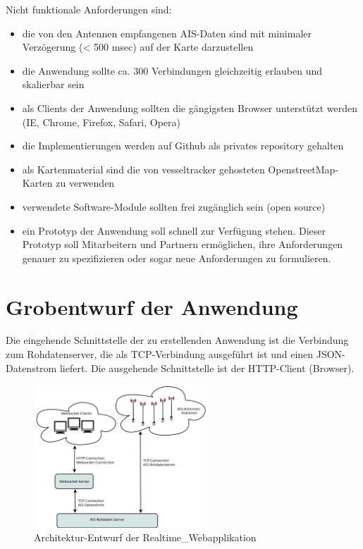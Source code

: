 Nicht funktionale Anforderungen sind:
\begin{itemize}
\item die von den Antennen empfangenen AIS-Daten sind mit minimaler Verzögerung (< 500 msec) auf der Karte darzustellen
\item die Anwendung sollte ca. 300 Verbindungen gleichzeitig erlauben und skalierbar sein
\item als Clients der Anwendung sollten die gängigsten Browser unterstützt werden (IE, Chrome, Firefox, Safari, Opera) 
\item die Implementierungen werden auf Github als privates repository gehalten
\item als Kartenmaterial sind die von vesseltracker gehosteten OpenstreetMap-Karten zu verwenden
\item verwendete Software-Module sollten frei zugänglich sein (open source) 
\item ein Prototyp der Anwendung soll schnell zur Verfügung stehen. Dieser Prototyp soll Mitarbeitern und Partnern ermöglichen, ihre Anforderungen genauer zu spezifizieren oder sogar neue Anforderungen zu formulieren. 
\end{itemize}

\section{Grobentwurf der Anwendung}\label{s.Grobentwurf der Anwendung}
Die eingehende Schnittstelle der zu erstellenden Anwendung ist die Verbindung zum Rohdatenserver, die als TCP-Verbindung ausgeführt ist und einen JSON-Datenstrom liefert.
Die ausgehende Schnittstelle ist der HTTP-Client (Browser).
\begin{figure}
  \begin{center}
    \includegraphics[width=0.58\textwidth]{images/Exposee_graphik_Realtimeapp}
  \end{center}
  \caption{Architektur-Entwurf der Realtime\_Webapplikation}
\end{figure}

